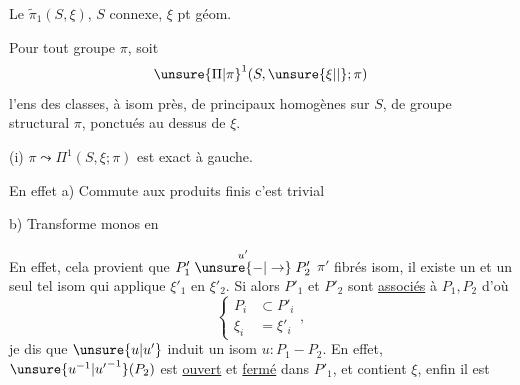 Le $\widetilde{\pi}_1(S,\xi)$, $S$  connexe, $\xi$ pt géom.

Pour tout groupe $\pi$, soit
\[
\unsure{\Pi|\pi}^{1}(S,\unsure{\xi|\vert};\pi)
\]
l'ens des classes, à isom près, de   principaux
homogènes sur $S$, de groupe structural $\pi$,
ponctués au dessus de $\xi$.

(i) $\pi\leadsto\Pi^1(S,\xi;\pi)$ est exact à gauche.

En effet \quad a) Commute aux produits finis
c'est trivial

b) Transforme monos  en 

En effet, cela provient que  
 $P'_1\mathrel{\overset{u'}{\unsure{-|\to}}}P'_2$   $\pi'$ fibrés  isom,
il existe un et un seul tel isom
qui applique $\xi'_1$ en $\xi'_2$. Si alors
$P'_1$ et $P'_2$ sont \uline{associés} à $P_1,P_2$ d'où
\[
\left\{\begin{aligned}P_i&\subset P'_i\\ \xi_i&=\xi'_i\end{aligned}\right.,
\]
 je dis que $\unsure{u|u'}$ 
 induit un isom $u:P_1\mathrel{-}P_2$. En
effet, 
$\unsure{u^{-1}|{u'}^{-1}}(P_2)$ est \uline{ouvert} et \uline{fermé} dans
$P'_1$, et contient $\xi$, enfin il est 

